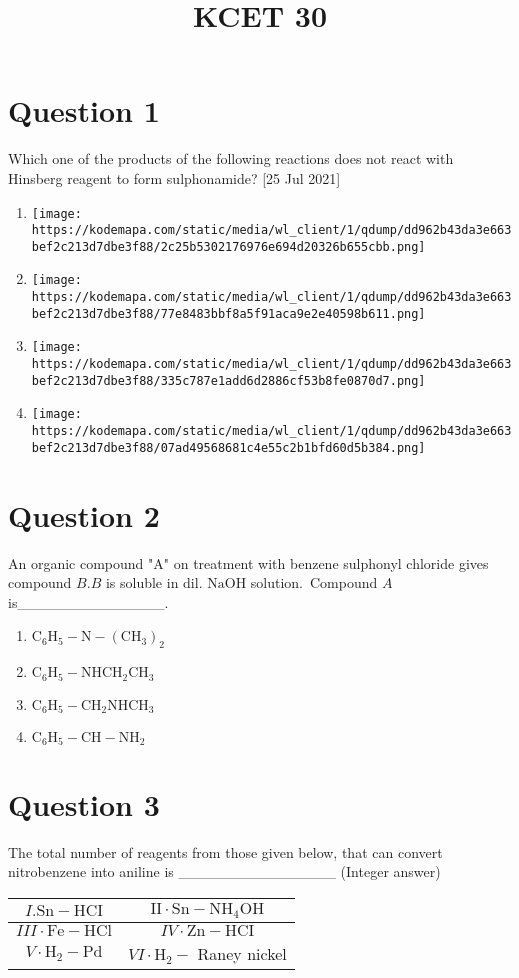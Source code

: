 \documentclass{article}
\title{KCET 30}
\begin{document}
                    \maketitle
                    \section*{Question 1}
Which one of the products of the following reactions does not react with Hinsberg reagent to form sulphonamide? [25 Jul 2021]
\begin{enumerate}[label=(\alph*)]
\item \texttt{[image: https://kodemapa.com/static/media/wl\_client/1/qdump/dd962b43da3e663bef2c213d7dbe3f88/2c25b5302176976e694d20326b655cbb.png]}
\item \texttt{[image: https://kodemapa.com/static/media/wl\_client/1/qdump/dd962b43da3e663bef2c213d7dbe3f88/77e8483bbf8a5f91aca9e2e40598b611.png]}
\item \texttt{[image: https://kodemapa.com/static/media/wl\_client/1/qdump/dd962b43da3e663bef2c213d7dbe3f88/335c787e1add6d2886cf53b8fe0870d7.png]}
\item \texttt{[image: https://kodemapa.com/static/media/wl\_client/1/qdump/dd962b43da3e663bef2c213d7dbe3f88/07ad49568681c4e55c2b1bfd60d5b384.png]}
\end{enumerate}
\newpage
\section*{Question 2}
An organic compound "A" on treatment with benzene sulphonyl chloride gives compound \(B . B\) is soluble in dil. \(\mathrm{NaOH}\) solution. Compound \(A\) is______________. 
\begin{enumerate}[label=(\alph*)]
\item \(\mathrm{C}_6 \mathrm{H}_5-\mathrm{N}-\left(\mathrm{CH}_3\right)_2\)
\item \(\mathrm{C}_6 \mathrm{H}_5-\mathrm{NHCH}_2 \mathrm{CH}_3\)
\item \(\mathrm{C}_6 \mathrm{H}_5-\mathrm{CH}_2 \mathrm{NHCH}_3\)
\item \(\mathrm{C}_6 \mathrm{H}_5-\mathrm{CH}-\mathrm{NH}_2\)
\end{enumerate}
\newpage
\section*{Question 3}
The total number of reagents from those given below, that can convert nitrobenzene into aniline is _______________ (Integer answer)\setlength{\arrayrulewidth}{0.8mm}
\begin{tabular}{|c|c|}
\hline
\(I . \mathrm{Sn}-\mathrm{HCI}\) & \(\mathrm{II} \cdot \mathrm{Sn}-\mathrm{NH}_4 \mathrm{OH}\) \\
\hline
\(I I I \cdot \mathrm{Fe}-\mathrm{HCl}\) & \(I V \cdot \mathrm{Zn}-\mathrm{HCI}\) \\
\hline
\(V \cdot \mathrm{H}_2-\mathrm{Pd}\) & \(V I \cdot \mathrm{H}_2-\) Raney nickel \\
\hline
\end{tabular}
\setlength{\arrayrulewidth}{0.4mm}
\end{document}
